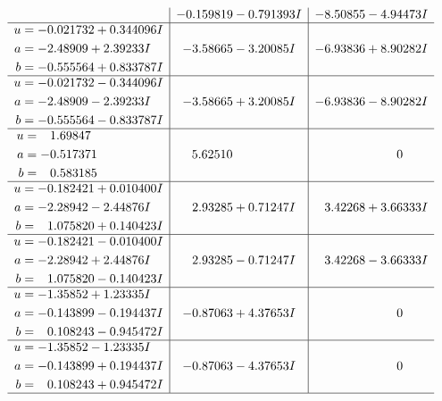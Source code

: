 \documentclass[1p]{elsarticle_modified}
\theoremstyle{definition}
\begin{document}
$$\begin{array}{c|c|c}
 & -0.159819 - 0.791393 I & -8.50855 - 4.94473 I \\ \hline\begin{aligned}
u &= -0.021732 + 0.344096 I \\
a &= -2.48909 + 2.39233 I \\
b &= -0.555564 + 0.833787 I\end{aligned}
 & -3.58665 - 3.20085 I & -6.93836 + 8.90282 I \\ \hline\begin{aligned}
u &= -0.021732 - 0.344096 I \\
a &= -2.48909 - 2.39233 I \\
b &= -0.555564 - 0.833787 I\end{aligned}
 & -3.58665 + 3.20085 I & -6.93836 - 8.90282 I \\ \hline\begin{aligned}
u &= \phantom{-}1.69847\phantom{ +0.000000I} \\
a &= -0.517371\phantom{ +0.000000I} \\
b &= \phantom{-}0.583185\phantom{ +0.000000I}\end{aligned}
 & \phantom{-}5.62510\phantom{ +0.000000I} & \phantom{-0.000000 } 0 \\ \hline\begin{aligned}
u &= -0.182421 + 0.010400 I \\
a &= -2.28942 - 2.44876 I \\
b &= \phantom{-}1.075820 + 0.140423 I\end{aligned}
 & \phantom{-}2.93285 + 0.71247 I & \phantom{-}3.42268 + 3.66333 I \\ \hline\begin{aligned}
u &= -0.182421 - 0.010400 I \\
a &= -2.28942 + 2.44876 I \\
b &= \phantom{-}1.075820 - 0.140423 I\end{aligned}
 & \phantom{-}2.93285 - 0.71247 I & \phantom{-}3.42268 - 3.66333 I \\ \hline\begin{aligned}
u &= -1.35852 + 1.23335 I \\
a &= -0.143899 - 0.194437 I \\
b &= \phantom{-}0.108243 - 0.945472 I\end{aligned}
 & -0.87063 + 4.37653 I & \phantom{-0.000000 } 0 \\ \hline\begin{aligned}
u &= -1.35852 - 1.23335 I \\
a &= -0.143899 + 0.194437 I \\
b &= \phantom{-}0.108243 + 0.945472 I\end{aligned}
 & -0.87063 - 4.37653 I & \phantom{-0.000000 } 0\\
 \hline 
 \end{array}$$\newpage\newpage\renewcommand{\arraystretch}{1}
\end{document}
